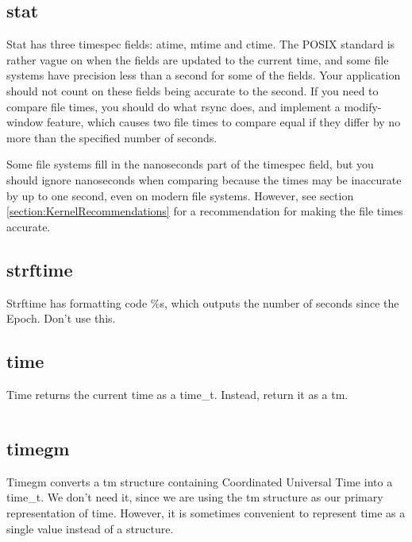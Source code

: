 \documentclass[letterpaper,twoside]{article}
\begin{document}
\subsection{stat}
Stat has three timespec fields: atime, mtime and ctime.  The POSIX standard
is rather vague on when the fields are updated to the current time, and
some file systems have precision less than a second for some of the fields.
Your application should not count on these fields being accurate to
the second.  If you need to compare file times, you should do what
rsync does, and implement a modify-window feature, which causes two
file times to compare equal if they differ by no more than the specified
number of seconds.

Some file systems fill in the nanoseconds part of the timespec field,
but you should ignore nanoseconds when comparing because the times may be
inaccurate by up to one second, even on modern file systems.
However, see section \ref{section:KernelRecommendations} for a
recommendation for making the file times accurate.

\subsection{strftime}
Strftime has formatting code \%s, which outputs the number of seconds
since the Epoch.  Don't use this.

\subsection{time}
Time returns the current time as a {\ttfamily time\_t}.
Instead, return it as a {\ttfamily tm}.
\inputminted[firstline=34]{c}{src/time_current_tm.c}

\subsection{timegm}
Timegm converts a {\ttfamily tm} structure containing Coordinated Universal Time
into a {\ttfamily time\_t}.
We don't need it, since we are using the {\ttfamily tm} structure
as our primary representation of time.  However, it is sometimes
convenient to represent time as a single value instead of a structure.
\inputminted[firstline=32]{c}{src/time_tm_to_integer.c}
\end{document}

